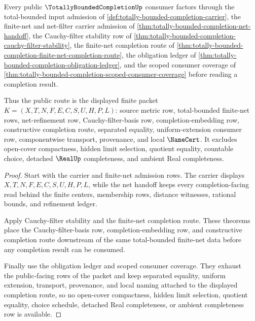 \begin{theorem}
\label{thm:totally-bounded-completion-public-finite-net-route}
Every public $\TotallyBoundedCompletionUp$ consumer factors through the total-bounded input admission of \autoref{def:totally-bounded-completion-carrier}, the finite-net and net-filter carrier admission of \autoref{thm:totally-bounded-completion-net-handoff}, the Cauchy-filter stability row of \autoref{thm:totally-bounded-completion-cauchy-filter-stability}, the finite-net completion route of \autoref{thm:totally-bounded-completion-finite-net-completion-route}, the obligation ledger of \autoref{thm:totally-bounded-completion-obligation-ledger}, and the scoped consumer coverage of \autoref{thm:totally-bounded-completion-scoped-consumer-coverage} before reading a completion result.

Thus the public route is the displayed finite packet $K=(X,T,N,F,E,C,S,U,H,P,L)$: source metric row, total-bounded finite-net rows, net-refinement row, Cauchy-filter-basis row, completion-embedding row, constructive completion route, separated equality, uniform-extension consumer row, componentwise transport, provenance, and local $\NameCert$. It excludes open-cover compactness, hidden limit selection, quotient equality, countable choice, detached $\RealUp$ completeness, and ambient Real completeness.
\end{theorem}
\begin{proof}
Start with the carrier and finite-net admission rows. The carrier displays $X,T,N,F,E,C,S,U,H,P,L$, while the net handoff keeps every completion-facing read behind the finite centers, membership rows, distance witnesses, rational bounds, and refinement ledger.

Apply Cauchy-filter stability and the finite-net completion route. These theorems place the Cauchy-filter-basis row, completion-embedding row, and constructive completion route downstream of the same total-bounded finite-net data before any completion result can be consumed.

Finally use the obligation ledger and scoped consumer coverage. They exhaust the public-facing rows of the packet and keep separated equality, uniform extension, transport, provenance, and local naming attached to the displayed completion route, so no open-cover compactness, hidden limit selection, quotient equality, choice schedule, detached Real completeness, or ambient completeness row is available.
\end{proof}

